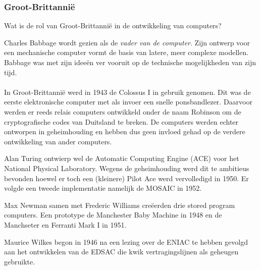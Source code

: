 \documentclass[../main.tex]{subfiles}
\begin{document}
\subsubsection{Groot-Brittanni\"e}
\begin{question}
Wat is de rol van Groot-Brittanni\"e in de ontwikkeling van computers?
\end{question}
\begin{solution}
Charles Babbage wordt gezien als de \emph{vader van de computer}. Zijn ontwerp voor een mechanische computer vormt de basis van latere, meer complexe modellen. Babbage was met zijn idee\"en ver vooruit op de technische mogelijkheden van
zijn tijd.
\\\\
In Groot-Brittanni\"e werd in 1943 de Colossus I in gebruik genomen. Dit was de eerste elektronische computer met als invoer een snelle ponsbandlezer.
Daarvoor werden er reeds relais computers ontwikkeld onder de naam Robinson om de cryptografische codes van Duitsland te breken.
De computers werden echter ontworpen in geheimhouding en hebben dus geen invloed gehad op de verdere ontwikkeling van ander computers.

Alan Turing ontwierp wel de Automatic Computing Engine (ACE) voor het National Physical Laboratory.
Wegens de geheimhouding werd dit te ambitieus bevonden hoewel er toch een (kleinere) Pilot Ace werd vervolledigd in 1950.
Er volgde een tweede implementatie namelijk de MOSAIC in 1952.

Max Newman samen met Frederic Williams cre\"eerden drie stored program computers.
Een prototype de Manchester Baby Machine in 1948 en de Manchseter en Ferranti Mark I in 1951.

Maurice Wilkes begon in 1946 na een lezing over de ENIAC te hebben gevolgd aan het ontwikkelen van de EDSAC die kwik vertragingslijnen als geheugen gebruikte.
\end{solution}
\end{document}
